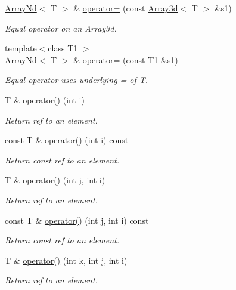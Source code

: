 \begin{DoxyCompactItemize}
\mbox{\hyperlink{classADAT_1_1ArrayNd}{Array\+Nd}}$<$ T $>$ \& \mbox{\hyperlink{classADAT_1_1ArrayNd_aa02a148fb7073245d21688eaa40d820b}{operator=}} (const \mbox{\hyperlink{classXMLArray_1_1Array3d}{Array3d}}$<$ T $>$ \&s1)
\begin{DoxyCompactList}\small\item\em Equal operator on an Array3d. \end{DoxyCompactList}\item 
{\footnotesize template$<$class T1 $>$ }\\\mbox{\hyperlink{classADAT_1_1ArrayNd}{Array\+Nd}}$<$ T $>$ \& \mbox{\hyperlink{classADAT_1_1ArrayNd_a4b2d8a768beccefe12844f27c50b058b}{operator=}} (const T1 \&s1)
\begin{DoxyCompactList}\small\item\em Equal operator uses underlying = of T. \end{DoxyCompactList}\item 
T \& \mbox{\hyperlink{classADAT_1_1ArrayNd_a927bb95e9323c4f74e0721ee867bcb64}{operator()}} (int i)
\begin{DoxyCompactList}\small\item\em Return ref to an element. \end{DoxyCompactList}\item 
const T \& \mbox{\hyperlink{classADAT_1_1ArrayNd_a0b16b5d4f7eed2684623a9c1dbcfeebe}{operator()}} (int i) const
\begin{DoxyCompactList}\small\item\em Return const ref to an element. \end{DoxyCompactList}\item 
T \& \mbox{\hyperlink{classADAT_1_1ArrayNd_a935f9f5199e47612b81056ac7b654c24}{operator()}} (int j, int i)
\begin{DoxyCompactList}\small\item\em Return ref to an element. \end{DoxyCompactList}\item 
const T \& \mbox{\hyperlink{classADAT_1_1ArrayNd_a476aa275f16078c90cb745312f344194}{operator()}} (int j, int i) const
\begin{DoxyCompactList}\small\item\em Return const ref to an element. \end{DoxyCompactList}\item 
T \& \mbox{\hyperlink{classADAT_1_1ArrayNd_a8c15c0d70203e59f5f746350eb6262a9}{operator()}} (int k, int j, int i)
\begin{DoxyCompactList}\small\item\em Return ref to an element. \end{DoxyCompactList}\item 

\end{DoxyCompactItemize}
